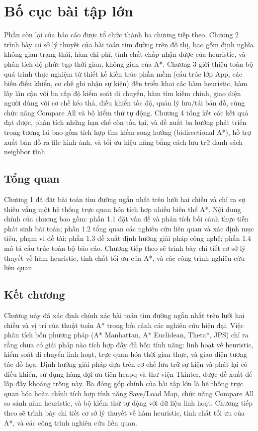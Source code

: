 \documentclass[../BTL.tex]{subfiles}
\begin{document}
\section{Bố cục bài tập lớn}
\label{section:1.4}

Phần còn lại của báo cáo được tổ chức thành ba chương tiếp theo. Chương 2 trình bày cơ sở lý thuyết của bài toán tìm đường trên đồ thị, bao gồm định nghĩa không gian trạng thái, hàm chi phí, tính chất chấp nhận được của heuristic, và phân tích độ phức tạp thời gian, không gian của A*. Chương 3 giới thiệu toàn bộ quá trình thực nghiệm từ thiết kế kiến trúc phần mềm (cấu trúc lớp App, các biến điều khiển, cơ chế ghi nhận sự kiện) đến triển khai các hàm heuristic, hàm lấy lân cận với ba cấp độ kiểm soát di chuyển, hàm tìm kiếm chính, giao diện người dùng với cơ chế kéo thả, điều khiển tốc độ, quản lý lưu/tải bản đồ, cùng chức năng Compare All và bộ kiểm thử tự động. Chương 4 tổng kết các kết quả đạt được, phân tích những hạn chế còn tồn tại, và đề xuất ba hướng phát triển trong tương lai bao gồm tích hợp tìm kiếm song hướng (bidirectional A*), hỗ trợ xuất bản đồ ra file hình ảnh, và tối ưu hiệu năng bằng cách lưu trữ danh sách neighbor tĩnh.

\subsection*{Tổng quan}

Chương 1 đã đặt bài toán tìm đường ngắn nhất trên lưới hai chiều và chỉ ra sự thiếu vắng một hệ thống trực quan hóa tích hợp nhiều biến thể A*. Nội dung chính của chương bao gồm: phần 1.1 đặt vấn đề và phân tích bối cảnh thực tiễn phát sinh bài toán; phần 1.2 tổng quan các nghiên cứu liên quan và xác định mục tiêu, phạm vi đề tài; phần 1.3 đề xuất định hướng giải pháp công nghệ; phần 1.4 mô tả cấu trúc toàn bộ báo cáo. Chương tiếp theo sẽ trình bày chi tiết cơ sở lý thuyết về hàm heuristic, tính chất tối ưu của A*, và các công trình nghiên cứu liên quan.

\subsection*{Kết chương}

Chương này đã xác định chính xác bài toán tìm đường ngắn nhất trên lưới hai chiều và vị trí của thuật toán A* trong bối cảnh các nghiên cứu hiện đại. Việc phân tích bốn phương pháp (A* Manhattan, A* Euclidean, Theta*, JPS) chỉ ra rằng chưa có giải pháp nào tích hợp đầy đủ bốn tính năng: linh hoạt về heuristic, kiểm soát di chuyển linh hoạt, trực quan hóa thời gian thực, và giao diện tương tác đồ họa. Định hướng giải pháp dựa trên cơ chế lưu trữ sự kiện và phát lại có điều khiển, sử dụng hàng đợi ưu tiên heapq và thư viện Tkinter, được đề xuất để lấp đầy khoảng trống này. Ba đóng góp chính của bài tập lớn là hệ thống trực quan hóa hoàn chỉnh tích hợp tính năng Save/Load Map, chức năng Compare All so sánh năm heuristic, và bộ kiểm thử tự động với dữ liệu linh hoạt. Chương tiếp theo sẽ trình bày chi tiết cơ sở lý thuyết về hàm heuristic, tính chất tối ưu của A*, và các công trình nghiên cứu liên quan.
\end{document}
